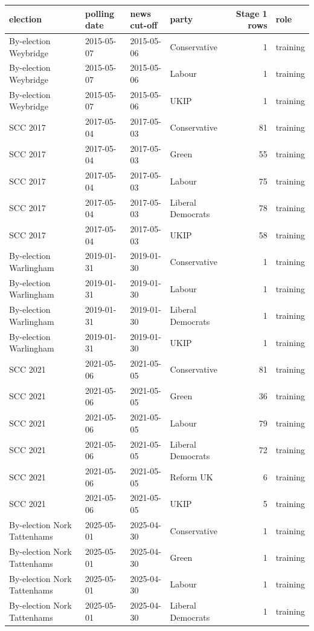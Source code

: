 \begin{tabular}{llllrl}
\toprule
election & polling date & news cut-off & party & Stage 1 rows & role \\
\midrule
By-election Weybridge & 2015-05-07 & 2015-05-06 & Conservative & 1 & training \\
By-election Weybridge & 2015-05-07 & 2015-05-06 & Labour & 1 & training \\
By-election Weybridge & 2015-05-07 & 2015-05-06 & UKIP & 1 & training \\
SCC 2017 & 2017-05-04 & 2017-05-03 & Conservative & 81 & training \\
SCC 2017 & 2017-05-04 & 2017-05-03 & Green & 55 & training \\
SCC 2017 & 2017-05-04 & 2017-05-03 & Labour & 75 & training \\
SCC 2017 & 2017-05-04 & 2017-05-03 & Liberal Democrats & 78 & training \\
SCC 2017 & 2017-05-04 & 2017-05-03 & UKIP & 58 & training \\
By-election Warlingham & 2019-01-31 & 2019-01-30 & Conservative & 1 & training \\
By-election Warlingham & 2019-01-31 & 2019-01-30 & Labour & 1 & training \\
By-election Warlingham & 2019-01-31 & 2019-01-30 & Liberal Democrats & 1 & training \\
By-election Warlingham & 2019-01-31 & 2019-01-30 & UKIP & 1 & training \\
SCC 2021 & 2021-05-06 & 2021-05-05 & Conservative & 81 & training \\
SCC 2021 & 2021-05-06 & 2021-05-05 & Green & 36 & training \\
SCC 2021 & 2021-05-06 & 2021-05-05 & Labour & 79 & training \\
SCC 2021 & 2021-05-06 & 2021-05-05 & Liberal Democrats & 72 & training \\
SCC 2021 & 2021-05-06 & 2021-05-05 & Reform UK & 6 & training \\
SCC 2021 & 2021-05-06 & 2021-05-05 & UKIP & 5 & training \\
By-election Nork Tattenhams & 2025-05-01 & 2025-04-30 & Conservative & 1 & training \\
By-election Nork Tattenhams & 2025-05-01 & 2025-04-30 & Green & 1 & training \\
By-election Nork Tattenhams & 2025-05-01 & 2025-04-30 & Labour & 1 & training \\
By-election Nork Tattenhams & 2025-05-01 & 2025-04-30 & Liberal Democrats & 1 & training \\

\end{tabular}
